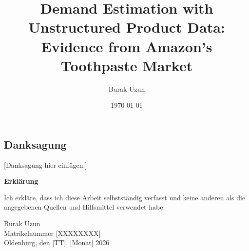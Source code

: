 \documentclass[a4paper,titlepage,liststotoc,final,twoside,openright,cleardoubleempty,BCOR12mm]{scrreprt}
\title{Demand Estimation with Unstructured Product Data: Evidence from Amazon's Toothpaste Market}
\author{Burak Uzun}
\date{\today}
\begin{document}

\begin{titlepage}
 
\end{titlepage}

\newpage
\thispagestyle{empty}
\quad

\newpage
\thispagestyle{empty}
\quad
\begin{otherlanguage}{ngerman}
\section*{Danksagung}
[Danksagung hier einf\"ugen.]

\vspace{6.8cm}
\begin{center}
\begin{Large}
\textbf{Erkl\"arung}
\end{Large}
\end{center}

\noindent
Ich erkl\"are, dass ich diese Arbeit selbstst\"andig verfasst und keine anderen als die angegebenen
Quellen und Hilfsmittel verwendet habe.

\vspace{3cm}
\noindent
Burak Uzun\\
Matrikelnummer [XXXXXXXX]\\
Oldenburg, den [TT]. [Monat] 2026
\end{otherlanguage}
\end{document}
